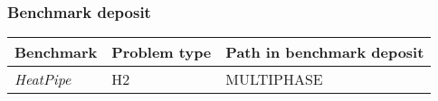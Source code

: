 \clearpage
\subsubsection*{\upshape\textbf{Benchmark deposit}}
\begin{tabular}{|l|l|l|}
\hline
Benchmark & Problem type & Path in benchmark deposit \\
\hline
\emph{HeatPipe}& H2 & MULTIPHASE \\
\hline
\end{tabular}
\clearpage
